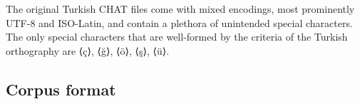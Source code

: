 \documentclass[a4paper, 11pt]{book}
\newcommand{\und}{\underline{{ }}\hspace{0.2mm}}	%
\begin{document}
The original Turkish CHAT files come with mixed encodings, most prominently UTF-8 and ISO-Latin, and contain a plethora of unintended special characters. The only special characters that are well-formed by the criteria of the Turkish orthography are ⟨ç⟩, ⟨ğ⟩, ⟨ö⟩, ⟨ş⟩, ⟨ü⟩.


\subsection{Corpus format}

\end{document}

